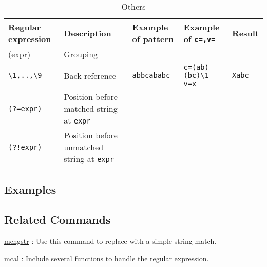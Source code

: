\begin{table}[htbp]
\begin{center}
{\small
\caption{Others\label{tbl:msed_regex4}}
\begin{tabular}{l|l|l|l|l}
\hline
Regular expression        & Description                                      & Example of pattern            & Example of \verb|c=,v=|         & Result \\
\hline
(expr)          & Grouping                                &&& \\			
\verb|\1,..,\9| & Back reference                                  & \verb|abbcababc| &\verb|c=(ab)(bc)\1 v=x| & \verb|Xabc| \\
\verb|(?=expr)| & Position before matched string at \verb|expr|   &&& \\
\verb|(?!expr)| & Position before unmatched string at \verb|expr|  &&& \\
\hline
\end{tabular} 
}
\end{center}
\end{table} 


\subsection*{Examples}

\subsection*{Related Commands}
\hyperref[sect:mchgstr] {mchgstr} : Use this command to replace with a simple string match.

\hyperref[sect:mcal] {mcal} :  Include several functions to handle the regular expression.

%
